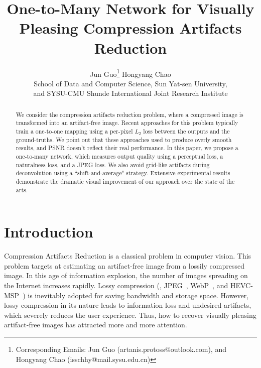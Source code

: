 \documentclass[10pt,twocolumn,letterpaper]{article}
\begin{document}
\title{One-to-Many Network for Visually Pleasing Compression Artifacts Reduction}

\author{Jun Guo\thanks{Corresponding Emails: Jun Guo (artanis.protoss@outlook.com), and Hongyang Chao (isschhy@mail.sysu.edu.cn)} \qquad Hongyang Chao\footnotemark[1]\\
School of Data and Computer Science, Sun Yat-sen University,\\
and SYSU-CMU Shunde International Joint Research Institute
}%

\maketitle
\thispagestyle{empty}

\begin{abstract}
We consider the compression artifacts reduction problem, where a compressed image is transformed into an artifact-free image. Recent approaches for this problem typically train a one-to-one mapping using a per-pixel $L_2$ loss between the outputs and the ground-truths. We point out that these approaches used to produce overly smooth results, and PSNR doesn't reflect their real performance. In this paper, we propose a one-to-many network, which measures output quality using a perceptual loss, a naturalness loss, and a JPEG loss. We also avoid grid-like artifacts during deconvolution using a ``shift-and-average" strategy. Extensive experimental results demonstrate the dramatic visual improvement of our approach over the state of the arts.
\end{abstract}
\vspace{-1em}

\section{Introduction}
Compression Artifacts Reduction is a classical problem in computer vision. This problem targets at estimating an artifact-free image from a lossily compressed image. In this age of information explosion, the number of images spreading on the Internet increases rapidly. Lossy compression (\eg, JPEG~\cite{jpeg}, WebP~\cite{webp}, and HEVC-MSP~\cite{hevc}) is inevitably adopted for saving bandwidth and storage space. However, lossy compression in its nature leads to information loss and undesired artifacts, which severely reduces the user experience. Thus, how to recover visually pleasing artifact-free images has attracted more and more attention.
\end{document}
